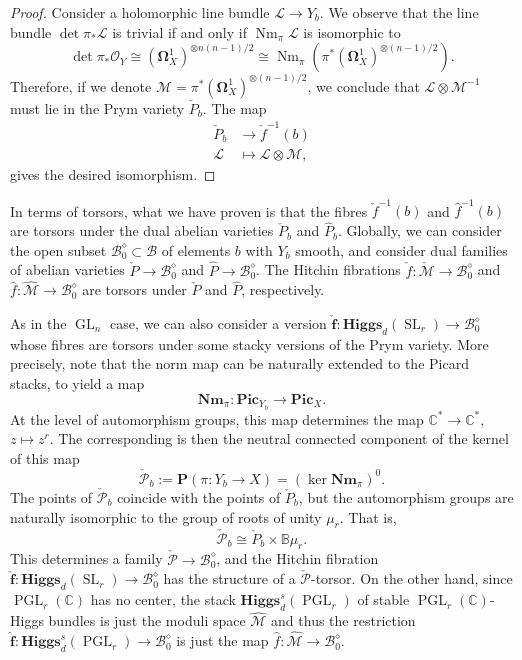 \documentclass[12pt,a4paper]{amsbook}
\theoremstyle{remark} \newtheorem{rmk}[thm]{Remark}
\theoremstyle{definition} \newtheorem{defn}[thm]{Definition}
\theoremstyle{definition} \newtheorem{ex}[thm]{Example}
\theoremstyle{definition} \newtheorem{ej}{Exercise}
\let\emph\relax
\newcommand{\C}{\mathbb C}
\newcommand{\bbB}{\mathbb B}
\newcommand{\cB}{\mathcal B}
\newcommand{\cM}{\mathcal M}
\newcommand{\cP}{\mathcal P}
\newcommand{\sO}{\mathscr O}
\newcommand{\sL}{\mathscr L}
\newcommand{\sM}{\mathscr M}
\DeclareMathOperator{\Nm}{Nm}
\DeclareMathOperator{\GL}{GL}
\DeclareMathOperator{\SL}{SL}
\DeclareMathOperator{\PGL}{PGL}
\begin{document}
\begin{proof}
Consider a holomorphic line bundle $\sL\rightarrow Y_b$. We observe that the line bundle $\det \pi_* \sL$ is trivial if and only if $\Nm_\pi \sL$ is isomorphic to \[\det \pi_* \sO_Y \cong (\bm{\Omega}^1_X)^{\otimes n(n-1)/2}\cong \Nm_\pi(\pi^*(\bm{\Omega}^1_X)^{\otimes (n-1)/2}).\]
Therefore, if we denote $\sM =\pi^*(\bm{\Omega}^1_X)^{\otimes (n-1)/2}$, we conclude that $\sL \otimes \sM^{-1}$ must lie in the Prym variety $\check{P}_b$. The map
\begin{align*}
  \check{P}_b & \longrightarrow \check{f}^{-1}(b)  \\
  \sL  & \longmapsto \sL \otimes \sM,
\end{align*}
gives the desired isomorphism.
\end{proof}

In terms of torsors, what we have proven is that the fibres $\check{f}^{-1}(b)$ and $\hat{f}^{-1}(b)$ are torsors under the dual abelian varieties $\check{P}_b$ and $\hat{P}_b$. Globally, we can consider the open subset $\cB^{\diamond}_0\subset \cB$ of elements $b$ with $Y_b$ smooth, and consider dual families of abelian varieties $\check{P}\rightarrow \cB^{\diamond}_0$ and $\hat{P}\rightarrow \cB^\diamond_0$. The Hitchin fibrations $\check{f}:\check{\cM}\rightarrow \cB^{\diamond}_0$ and $\hat{f}:\hat{\cM}\rightarrow \cB^{\diamond}_0$ are torsors under $\check{P}$ and $\hat{P}$, respectively.

As in the $\GL_n$ case, we can also consider a version $\check{\bm{f}}: \mathbf{Higgs}_d(\SL_r) \rightarrow \cB^\diamond_0$ whose fibres are torsors under some stacky versions of the Prym variety. More precisely, note that the norm map can be naturally extended to the Picard stacks, to yield a map
\begin{equation*}
\mathbf{Nm}_\pi: \mathbf{Pic}_{Y_b} \rightarrow \mathbf{Pic}_X.
\end{equation*}
At the level of automorphism groups, this map determines the map $\C^* \rightarrow \C^*$, $z \mapsto z^r$.
The corresponding \emph{Prym stack} is then the neutral connected component of the kernel of this map
\begin{equation*}
 \check{\cP}_b:= \bm{P}(\pi:Y_b \rightarrow X) = (\ker \mathbf{Nm}_\pi)^0.
\end{equation*}
The points of $\check{\cP}_b$ coincide with the points of $\check{P}_b$, but the automorphism groups are naturally isomorphic to the group of roots of unity $\mu_r$. That is,
\begin{equation*}
\check{\cP}_b \cong \check{P}_b \times \bbB \mu_r.
\end{equation*}
This determines a family $\check{\cP}\rightarrow \cB^\diamond_0$, and the Hitchin fibration $\check{\bm{f}}: \mathbf{Higgs}_d(\SL_r) \rightarrow \cB^\diamond_0$ has the structure of a $\check{\cP}$-torsor.
On the other hand, since $\PGL_r(\C)$ has no center, the stack $\mathbf{Higgs}_d^s(\PGL_r)$ of stable $\PGL_r(\C)$-Higgs bundles is just the moduli space $\hat{\cM}$ and thus the restriction $\hat{\bm{f}}:\mathbf{Higgs}_d^s(\PGL_r)\rightarrow \cB^{\diamond}_0$ is just the map $\hat{f}:\hat{\cM}\rightarrow \cB^{\diamond}_0$.
\end{document}
